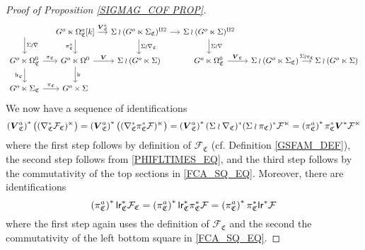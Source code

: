 \documentclass[a4paper,10pt
,draft
]{article}%
\numberwithin{equation}{section}
\numberwithin{figure}{section}
\theoremstyle{definition} %
\newcommand{\F}{\ensuremath{\mathcal F}}
\newcommand{\1}{\ensuremath{\mathbbm 1}}%
\begin{document}
\begin{proof}[Proof of Proposition \ref{SIGMAG_COF PROP}]
\begin{equation}
\begin{tikzcd}[column sep = small]
	\arrow[d, "\Sigma \wr \nabla"]
& %
	G^{o} \ltimes \Omega_{\mathfrak C}^{a}[k] \arrow[r, "\boldsymbol{V}_{\mathfrak C}^{a}"]
	\arrow[d, "\pi_{\mathfrak C}^a"']
&
	\Sigma \wr ( G^{o} \ltimes \Sigma_{\mathfrak C} )^{\amalg 2}
	\arrow[d, "\Sigma \wr \nabla_{\mathfrak C}"] \arrow[r]
&
	\Sigma \wr ( G^{o} \ltimes \Sigma )^{\amalg 2}
	\arrow[d, "\Sigma \wr \nabla"]
\\
	G^{o} \ltimes \Omega_{\mathfrak C}^{0} \arrow[r, "\pi_{\mathfrak C}"] \arrow{d}[swap]{\mathsf{lr}_{\mathfrak C}}
&
	G^{o} \ltimes \Omega^{0} \arrow[r, "\boldsymbol{V}"] \arrow[d, "\mathsf{lr}"]
&
	\Sigma \wr \left( G^{o} \ltimes \Sigma \right)
& %
	G^{o} \ltimes \Omega_{\mathfrak C}^{0} \arrow[r, "\boldsymbol{V}_{\mathfrak C}"]
&
	\Sigma \wr \left( G^{o} \ltimes \Sigma_{\mathfrak C} \right) \arrow[r, "\Sigma \wr \pi_{\mathfrak C}"]
&
	\Sigma \wr \left( G^{o} \ltimes \Sigma \right)
\\
	G^{o} \ltimes \Sigma_{\mathfrak C} \arrow[r, "\pi_{\mathfrak C}"]
&
	G^{o} \times \Sigma
\end{tikzcd}
\end{equation}
We now have a sequence of identifications
\begin{equation}\label{VSTREWRT EQ}
	\left(\boldsymbol{V}_{\mathfrak C}^{a}\right)^{\**} \left( (\nabla_{\mathfrak C}^{\**} \F_{\mathfrak C})^\ltimes \right)
=
	\left(\boldsymbol{V}_{\mathfrak C}^{a}\right)^{\**} \left( (\nabla_{\mathfrak C}^{\**} \pi^{\**}_{\mathfrak{C}} \F)^\ltimes \right) 
=
	\left(\boldsymbol{V}_{\mathfrak C}^{a}\right)^{\**}  (\Sigma \wr \nabla_{\mathfrak C})^{\**} (\Sigma \wr \pi_{\mathfrak C})^{\**} \F^\ltimes
=
	\left( \pi_{\mathfrak C}^a \right)^{\**} \pi_{\mathfrak C}^{\**} \boldsymbol{V}^{\**} \F^{\ltimes}
\end{equation}
where the first step follows by
definition of $\F_{\mathfrak{C}}$
(cf. Definition \ref{GSFAM_DEF}),
the second step follows from \eqref{PHIFLTIMES_EQ},
and the third step follows by the commutativity of the top sections in 
\eqref{FCA_SQ_EQ}.
Moreover, there are identifications
\begin{equation}\label{LRSTR EQ}
\left(\pi_{\mathfrak C}^a\right)^{\**} \mathsf{lr}_{\mathfrak C}^{\**} \F_{\mathfrak C}
=
\left(\pi_{\mathfrak C}^a\right)^{\**} \mathsf{lr}_{\mathfrak C}^{\**} \pi_{\mathfrak{C}}^{\**} \F
=
\left(\pi_{\mathfrak C}^a\right)^{\**} \pi_{\mathfrak C}^{\**} \mathsf{lr}^{\**} \F
\end{equation}
where the first step again uses the definition of $\F_{\mathfrak{C}}$
and the second the commutativity of the left bottom square in 
\eqref{FCA_SQ_EQ}.


\end{proof}
\end{document}
